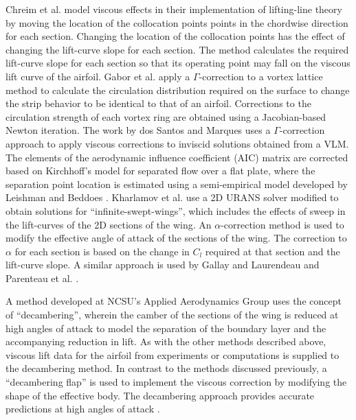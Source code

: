 Chreim et al. \cite{Chreim2018} model viscous effects in their implementation of lifting-line theory by moving the location of the collocation points points in the chordwise direction for each section. Changing the location of the collocation points has the effect of changing the lift-curve slope for each section. The method calculates the required lift-curve slope for each section so that its operating point may fall on the viscous lift curve of the airfoil.
Gabor et al. \cite{Gabor2016} apply a $\Gamma$-correction to a vortex lattice method to calculate the circulation distribution required on the surface to change the strip behavior to be identical to that of an airfoil. Corrections to the circulation strength of each vortex ring are obtained using a Jacobian-based Newton iteration.
The work by dos Santos and Marques \cite{Santos2018} uses a $\Gamma$-correction approach to apply viscous corrections to inviscid solutions obtained from a VLM. The elements of the aerodynamic influence coefficient (AIC) matrix are corrected based on Kirchhoff's model for separated flow over a flat plate, where the separation point location is estimated using a semi-empirical model developed by Leishman and Beddoes \cite{Leishman1989}.
Kharlamov et al. \cite{Kharlamov2018} use a 2D URANS solver modified to obtain solutions for ``infinite-swept-wings'', which includes the effects of sweep in the lift-curves of the 2D sections of the wing. An $\alpha$-correction method is used to modify the effective angle of attack of the sections of the wing. The correction to $\alpha$ for each section is based on the change in $C_l$ required at that section and the lift-curve slope.
A similar approach is used by Gallay and Laurendeau \cite{Gallay2016} and Parenteau et al. \cite{Parenteau2018,Parenteau2018b}.

A method developed at NCSU's Applied Aerodynamics Group uses the concept of ``decambering'', wherein the camber of the sections of the wing is reduced at high angles of attack to model the separation of the boundary layer and the accompanying reduction in lift.
As with the other methods described above, %
viscous lift data for the airfoil from experiments or computations is supplied to the decambering method. In contrast to the methods discussed previously, a ``decambering flap'' is used to implement the viscous correction by modifying the shape of the effective body.
The decambering approach provides accurate predictions at high angles of attack \cite{Mukherjee_poststall_2006,Paul_Gopa_Iteration_Schemes,gopalarathnam_paul_petrilli_ASM_2012}.

